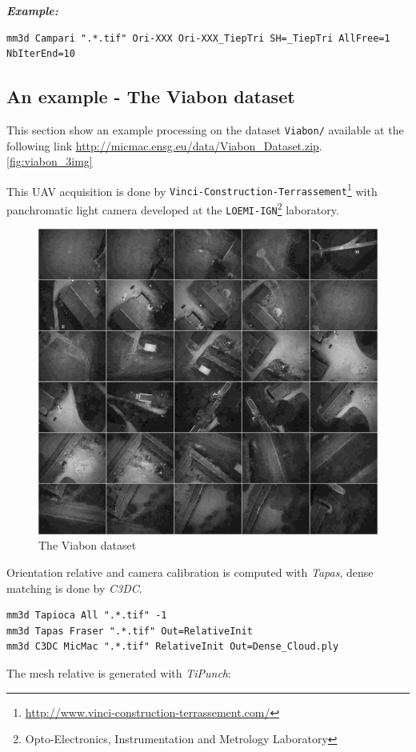 \textbf{\textit{Example:}}
\begin{verbatim}
mm3d Campari ".*.tif" Ori-XXX Ori-XXX_TiepTri SH=_TiepTri AllFree=1 NbIterEnd=10
\end{verbatim}


\subsection{An example - The Viabon dataset}
This section show an example processing on the dataset {\tt Viabon/} available at the following link \url{http://micmac.ensg.eu/data/Viabon_Dataset.zip}. \autoref{fig:viabon_3img}

This UAV acquisition is done by {\tt Vinci-Construction-Terrassement}\footnote{\url{http://www.vinci-construction-terrassement.com/}} with  panchromatic light camera developed at the {\tt LOEMI-IGN}\footnote{Opto-Electronics, Instrumentation and Metrology Laboratory} laboratory.\newline


\begin{figure}[H]
    \begin{center}
    \setlength{\unitlength}{0.5cm}
    \includegraphics[width=0.5\linewidth]{FIGS/Viabon/panel.jpg}
    \end{center}
    \caption{The Viabon dataset}
    \label{fig:iris}
\end{figure}

Orientation relative and camera calibration is computed with \textit{Tapas}, dense matching is done by \textit{C3DC}.

\begin{verbatim}
mm3d Tapioca All ".*.tif" -1
mm3d Tapas Fraser ".*.tif" Out=RelativeInit
mm3d C3DC MicMac ".*.tif" RelativeInit Out=Dense_Cloud.ply
\end{verbatim}

The mesh relative is generated with \textit{TiPunch}:

